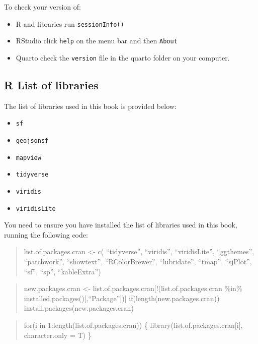 \documentclass[
  letterpaper,
  DIV=11,
  numbers=noendperiod]{scrreprt}
\providecommand{\tightlist}{%
  \setlength{\itemsep}{0pt}\setlength{\parskip}{0pt}}\usepackage{longtable,booktabs,array}
\begin{document}
To check your version of:

\begin{itemize}
\tightlist
\item
  R and libraries run \texttt{sessionInfo()}
\item
  RStudio click \texttt{help} on the menu bar and then \texttt{About}
\item
  Quarto check the \texttt{version} file in the quarto folder on your
  computer.
\end{itemize}

\hypertarget{r-list-of-libraries}{%
\subsection*{R List of libraries}\label{r-list-of-libraries}}

The list of libraries used in this book is provided below:

\begin{itemize}
\tightlist
\item
  \texttt{sf}
\item
  \texttt{geojsonsf}
\item
  \texttt{mapview}
\item
  \texttt{tidyverse}
\item
  \texttt{viridis}
\item
  \texttt{viridisLite}
\end{itemize}

You need to ensure you have installed the list of libraries used in this
book, running the following code:

\begin{quote}
list.of.packages.cran \textless- c( ``tidyverse'', ``viridis'',
``viridisLite'', ``ggthemes'', ``patchwork'', ``showtext'',
``RColorBrewer'', ``lubridate'', ``tmap'', ``sjPlot'', ``sf'', ``sp'',
``kableExtra'')
\end{quote}

\begin{quote}
new.packages.cran \textless-
list.of.packages.cran{[}!(list.of.packages.cran \%in\%
installed.packages(){[},``Package''{]}){]} if(length(new.packages.cran))
install.packages(new.packages.cran)
\end{quote}

\begin{quote}
for(i in 1:length(list.of.packages.cran)) \{
library(list.of.packages.cran{[}i{]}, character.only = T) \}
\end{quote}
\end{document}
